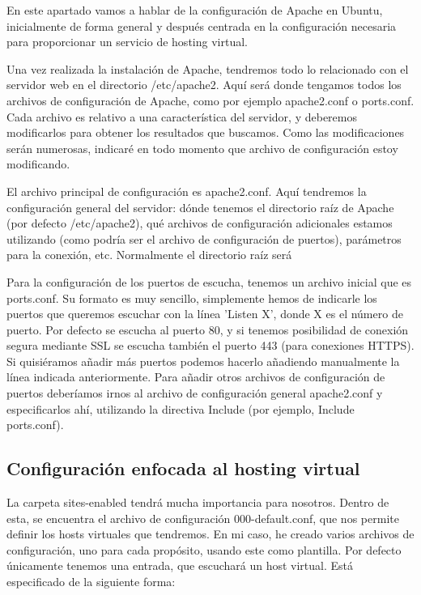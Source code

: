 \documentclass[a4paper, 10pt]{article} %
\begin{document}
En este apartado vamos a hablar de la configuración de Apache en Ubuntu, inicialmente de forma general y después centrada en la configuración necesaria para proporcionar un servicio de hosting virtual. 

Una vez realizada la instalación de Apache, tendremos todo lo relacionado con el servidor web en el directorio /etc/apache2. Aquí será donde tengamos todos los archivos de configuración de Apache, como por ejemplo apache2.conf o ports.conf. Cada archivo es relativo a una característica del servidor, y deberemos modificarlos para obtener los resultados que buscamos. Como las modificaciones serán numerosas, indicaré en todo momento que archivo de configuración estoy modificando. 

El archivo principal de configuración es apache2.conf. Aquí tendremos la configuración general del servidor: dónde tenemos el directorio raíz de Apache (por defecto /etc/apache2), qué archivos de configuración adicionales estamos utilizando (como podría ser el archivo de configuración de puertos), parámetros para la conexión, etc. Normalmente el directorio raíz será 

Para la configuración de los puertos de escucha, tenemos un archivo inicial que es ports.conf. Su formato es muy sencillo, simplemente hemos de indicarle los puertos que queremos escuchar con la línea 'Listen X', donde X es el número de puerto. Por defecto se escucha al puerto 80, y si tenemos posibilidad de conexión segura mediante SSL se escucha también el puerto 443 (para conexiones HTTPS). Si quisiéramos añadir más puertos podemos hacerlo añadiendo manualmente la línea indicada anteriormente. Para añadir otros archivos de configuración de puertos deberíamos irnos al archivo de configuración general apache2.conf y especificarlos ahí, utilizando la directiva Include (por ejemplo, Include ports.conf).

\subsection{Configuración enfocada al hosting virtual}

La carpeta sites-enabled tendrá mucha importancia para nosotros. Dentro de esta, se encuentra el archivo de configuración 000-default.conf, que nos permite definir los hosts virtuales que tendremos. En mi caso, he creado varios archivos de configuración, uno para cada propósito, usando este como plantilla. Por defecto únicamente tenemos una entrada, que escuchará un host virtual. Está especificado de la siguiente forma: 
\end{document}
